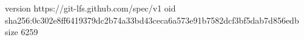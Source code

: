 version https://git-lfs.github.com/spec/v1
oid sha256:0c302e8ff6419379dc2b74a33bd43ceca6a573e91b7582dcf3bf5dab7d856edb
size 6259
